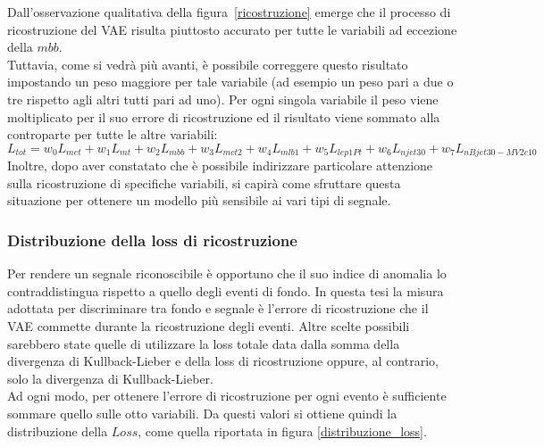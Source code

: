 Dall'osservazione qualitativa della figura~\ref{ricostruzione} emerge che il processo di ricostruzione del VAE risulta piuttosto accurato per tutte le variabili ad eccezione della $\textit{mbb}$. \\
Tuttavia, come si vedrà più avanti, è possibile correggere questo risultato impostando un peso maggiore per tale variabile (ad esempio un peso pari a due o tre rispetto agli altri tutti pari ad uno). Per ogni singola variabile il peso viene moltiplicato per il suo errore di ricostruzione ed il risultato viene sommato alla controparte per tutte le altre variabili:
\begin{equation}
	L_{tot} = w_0 L_{met} + w_1 L_{mt} + w_2 L_{mbb} + w_3 L_{mct2} + w_4 L_{mlb1} + w_5 L_{lep1Pt} + w_6 L_{njet30} + w_7 L_{nBjet30-MV2c10}
\end{equation} 
Inoltre, dopo aver constatato che è possibile indirizzare particolare attenzione sulla ricostruzione di specifiche variabili, si capirà come sfruttare questa situazione per ottenere un modello più sensibile ai vari tipi di segnale.\\





\subsubsection{Distribuzione della loss di ricostruzione}
\label{reco_loss}

Per rendere un segnale riconoscibile è opportuno che il suo indice di anomalia lo contraddistingua rispetto a quello degli eventi di fondo. In questa tesi la misura adottata per discriminare tra fondo e segnale è l'errore di ricostruzione che il VAE commette durante la ricostruzione degli eventi. Altre scelte possibili sarebbero state quelle di utilizzare la loss totale data dalla somma della divergenza di Kullback-Lieber e della loss di ricostruzione oppure, al contrario, solo la divergenza di Kullback-Lieber. \\ 
Ad ogni modo, per ottenere l'errore di ricostruzione per ogni evento è sufficiente sommare quello sulle otto variabili. Da questi valori si ottiene quindi la distribuzione della $\textit{Loss}$, come quella riportata in figura \ref{distribuzione_loss}. 

